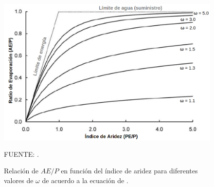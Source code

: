 \begin{figure}[ht!]
	\includegraphics[scale=.42]{Images/budyko01.png}
	\centering
	\caption{Relación de $AE/P$ en función del índice de aridez para diferentes valores de $\omega$ de acuerdo a la ecuación de \citet{Fu1981}.}
	{\raggedright FUENTE: \citet{Zhang2004}. \par}
	\label{fig:budyko01}
\end{figure}

 